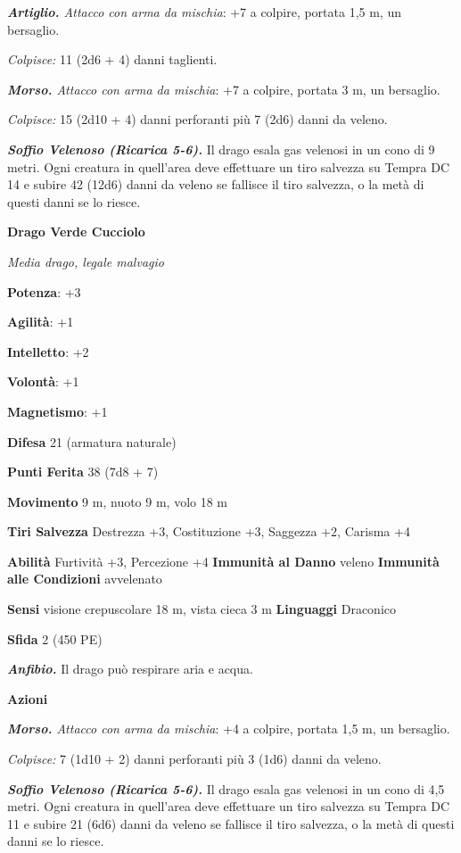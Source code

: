 \begin{multicols}{2}
\emph{\textbf{Artiglio.} Attacco con arma da mischia}: +7 a colpire,
portata 1,5 m, un bersaglio.

\emph{Colpisce:} 11 (2d6 + 4) danni taglienti.

\emph{\textbf{Morso.} Attacco con arma da mischia}: +7 a colpire,
portata 3 m, un bersaglio.

\emph{Colpisce:} 15 (2d10 + 4) danni perforanti più 7 (2d6) danni da
veleno.

\emph{\textbf{Soffio Velenoso (Ricarica 5-6).}} Il drago esala gas
velenosi in un cono di 9 metri. Ogni creatura in quell'area deve
effettuare un tiro salvezza su Tempra DC 14 e subire 42 (12d6)
danni da veleno se fallisce il tiro salvezza, o la metà di questi danni
se lo riesce.



\textbf{Drago Verde Cucciolo}

\emph{Media drago, legale malvagio}

\textbf{Potenza}: +3

\textbf{Agilità}: +1

\textbf{Intelletto}: +2

\textbf{Volontà}: +1

\textbf{Magnetismo}: +1

\textbf{Difesa} 21 (armatura naturale)

\textbf{Punti Ferita} 38 (7d8 + 7)

\textbf{Movimento} 9 m, nuoto 9 m, volo 18 m

\textbf{Tiri Salvezza} Destrezza +3, Costituzione +3, Saggezza +2,
Carisma +4

\textbf{Abilità} Furtività +3, Percezione +4 \textbf{Immunità al Danno}
veleno \textbf{Immunità alle Condizioni} avvelenato

\textbf{Sensi} visione crepuscolare 18 m, vista cieca 3 m
\textbf{Linguaggi} Draconico

\textbf{Sfida} 2 (450 PE)

\emph{\textbf{Anfibio.}} Il drago può respirare aria e acqua.

\textbf{Azioni}

\emph{\textbf{Morso.} Attacco con arma da mischia}: +4 a colpire,
portata 1,5 m, un bersaglio.

\emph{Colpisce:} 7 (1d10 + 2) danni perforanti più 3 (1d6) danni da
veleno.

\emph{\textbf{Soffio Velenoso (Ricarica 5-6).}} Il drago esala gas
velenosi in un cono di 4,5 metri. Ogni creatura in quell'area deve
effettuare un tiro salvezza su Tempra DC 11 e subire 21 (6d6)
danni da veleno se fallisce il tiro salvezza, o la metà di questi danni
se lo riesce.


\end{multicols}
